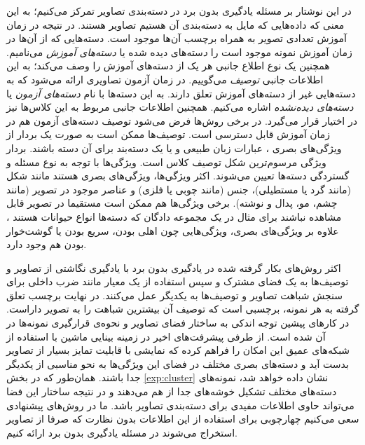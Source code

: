در این نوشتار بر مسئله یادگیری بدون برد در دسته‌بندی تصاویر تمرکز می‌کنیم؛ به این معنی که داده‌هایی که مایل به دسته‌بندی آن هستیم تصاویر هستند. در نتیجه در زمان آموزش تعدادی تصویر به همراه برچسب آن‌ها موجود است. دسته‌هایی که از آن‌ها در زمان آموزش نمونه موجود است را {\emph دسته‌های دیده شده} یا \emph{ دسته‌های آموزش} می‌نامیم. همچنین یک نوع اطلاع جانبی هر یک از دسته‌های آموزش را وصف می‌کند؛ به این اطلاعات جانبی \emph{ توصیف}  می‌گوییم. در زمان آزمون تصاویری ارائه می‌شود که به دسته‌هایی غیر از دسته‌های آموزش تعلق دارند. به این دسته‌ها با نام\emph{  دسته‌های آزمون}  یا \emph{ دسته‌های دیده‌نشده}  اشاره می‌کنیم. همچنین اطلاعات جانبی مربوط به این کلاس‌ها نیز در اختیار قرار می‌گیرد. در برخی روش‌ها فرض می‌شود توصیف دسته‌های آزمون هم در زمان آموزش قابل دسترسی است. توصیف‌ها ممکن است به صورت یک بردار از ویژگی‌های بصری \cite{farhadi09}،
 عبارات زبان طبیعی
 \cite{ng13, mohamed13, noroz14}
 و یا یک دسته‌بند برای آن دسته  \cite{Yu2013} باشند. بردار ویژگی مرسوم‌ترین شکل توصیف کلاس است. ویژگی‌ها با توجه به نوع مسئله و گستردگی دسته‌ها تعیین می‌شوند. اکثر ویژگی‌ها، ویژگی‌های بصری هستند مانند شکل (مانند گرد یا مستطیلی)، جنس (مانند چوبی یا فلزی) و عناصر موجود در تصویر (مانند چشم، مو، پدال و نوشته). برخی ویژگی‌ها هم ممکن است مستقیما در تصویر قابل مشاهده نباشند برای مثال در یک مجموعه دادگان که دسته‌ها انواع حیوانات هستند
 \cite{lampert09}،
 علاوه بر ویژگی‌های بصری، ویژگی‌هایی چون اهلی بودن، سریع‌ بودن یا گوشت‌خوار بودن هم وجود دارد.

 اکثر روش‌های بکار گرفته شده در یادگیری بدون برد با یادگیری نگاشتی از تصاویر و توصیف‌ها به یک فضای مشترک و سپس استفاده از یک معیار مانند ضرب داخلی برای سنجش شباهت تصاویر و توصیف‌ها به یکدیگر عمل می‌کنند. در نهایت برچسب تعلق گرفته به هر نمونه، برچسبی است که توصیف آن بیشترین شباهت را به تصویر داراست. در کارهای پیشین توجه اندکی به ساختار فضای تصاویر و نحوه‌ی قرارگیری نمونه‌ها در آن شده است. از طرفی پیشرفت‌های اخیر در زمینه بینایی ماشین با استفاده از شبکه‌های عمیق \cite{vgg} این امکان را فراهم کرده که نمایشی با قابلیت تمایز بسیار از تصاویر بدست آید و دسته‌های بصری مختلف در فضای این ویژگی‌ها به نحو مناسبی از یکدیگر جدا باشند. همان‌طور که در بخش \ref{exp:cluster} نشان داده خواهد شد، نمونه‌های دسته‌های مختلف تشکیل خوشه‌های جدا از هم می‌دهند و در نتیجه ساختار این فضا می‌تواند حاوی اطلاعات مفیدی برای دسته‌بندی تصاویر باشد. ما در روش‌های پیشنهادی سعی می‌کنیم چهارچوبی برای استفاده از این اطلاعات بدون نظارت که صرفا از تصاویر استخراج می‌شوند در مسئله یادگیری بدون برد ارائه کنیم.

